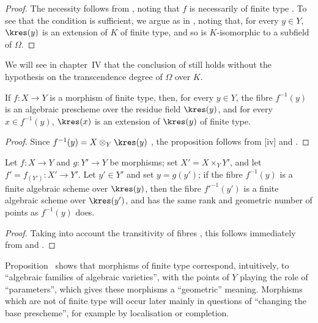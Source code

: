 \begin{proof}
The necessity follows from , noting that $f$ is necessarily of finite type .
To see that the condition is sufficient, we argue as in , noting that, for every $y\in Y$, $\kres(y)$ is an extension of $K$ of finite type, and so is $K$-isomorphic to a subfield of $\Omega$.
\end{proof}

\begin{remark}[6.4.10]
\label{I.6.4.10}
We will see in chapter~IV that the conclusion of  still holds without the hypothesis on the transcendence degree of $\Omega$ over $K$.
\end{remark}

\begin{proposition}[6.4.11]
\label{I.6.4.11}
If $f:X\to Y$ is a morphism of finite type, then, for every $y\in Y$, the fibre $f^{-1}(y)$ is an algebraic prescheme over the residue field $\kres(y)$, and for every $x\in f^{-1}(y)$, $\kres(x)$ is an extension of $\kres(y)$ of finite type.
\end{proposition}

\begin{proof}
Since $f^{-1}(y)=X\otimes_Y\kres(y)$ , the proposition follows from [iv] and .
\end{proof}

\begin{proposition}[6.4.12]
\label{I.6.4.12}
Let $f:X\to Y$ and $g:Y'\to Y$ be morphisms;
set $X'=X\times_Y Y'$, and let $f'=f_{(Y')}:X'\to Y'$.
Let $y'\in Y'$ and set $y=g(y')$;
if the fibre $f^{-1}(y)$ is a finite algebraic scheme over $\kres(y)$, then the fibre $f'^{-1}(y')$ is a finite algebraic scheme over $\kres(y')$, and has the same rank and geometric number of points as $f^{-1}(y)$ does.
\end{proposition}

\begin{proof}
Taking into account the transitivity of fibres , this follows immediately from  and .
\end{proof}

\begin{env}[6.4.13]
\label{I.6.4.13}
Proposition~ shows that morphisms of finite type correspond, intuitively, to ``algebraic families of algebraic varieties'', with the points of $Y$ playing
the role of ``parameters'', which gives these morphisms a ``geometric'' meaning.
Morphisms which are not of finite type will occur later mainly in questions of ``changing the base prescheme'', for example by localisation or completion.
\end{env}

